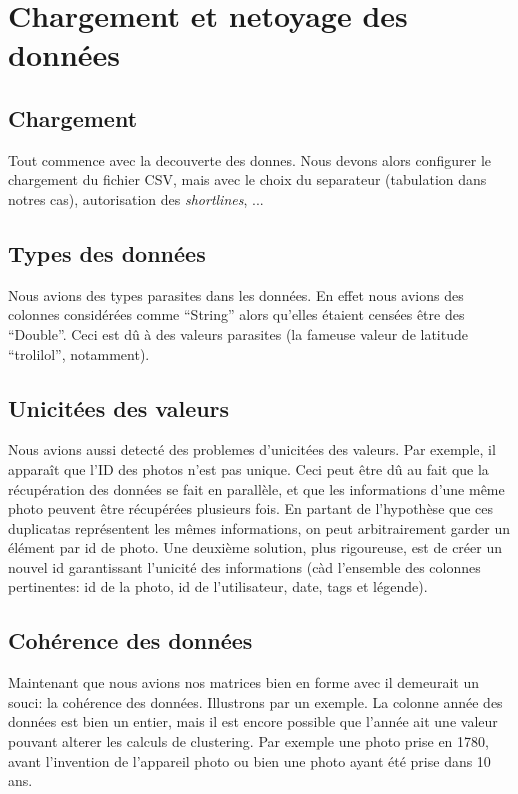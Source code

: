 \chapter{Chargement et netoyage des donn\'ees}

\section{Chargement}
    Tout commence avec la decouverte des donnes. Nous devons alors configurer le
    chargement du fichier CSV, mais avec le choix du separateur (tabulation dans
    notres cas), autorisation des \textit{shortlines}, ...

\section{Types des donn\'ees}
    Nous avions des types parasites dans les donn\'ees. En effet nous
    avions des colonnes considérées comme ``String'' alors qu'elles étaient
    censées être des ``Double''. Ceci est dû à des valeurs parasites (la fameuse
    valeur de latitude ``trolilol'', notamment).

\section{Unicit\'ees des valeurs}
    Nous avions aussi detect\'e des problemes d'unicit\'ees des valeurs. Par
    exemple, il apparaît que l'ID des photos n'est pas unique. Ceci peut être dû
    au fait que la récupération des données se fait en parallèle, et que les
    informations d'une même photo peuvent être récupérées plusieurs fois.
    En partant de l'hypothèse que ces duplicatas représentent les mêmes
    informations, on peut arbitrairement garder un élément par id de photo. Une
    deuxième solution, plus rigoureuse, est de créer un nouvel id garantissant
    l'unicité des informations (càd l'ensemble des colonnes pertinentes: id de
    la photo, id de l'utilisateur, date, tags et légende).

\section{Coh\'erence des donn\'ees}
    Maintenant que nous avions nos matrices bien en forme avec il demeurait un
    souci: la coh\'erence des donn\'ees. Illustrons par un exemple. La colonne
    ann\'ee des donn\'ees est bien un entier, mais il est encore possible que
    l'ann\'ee ait une valeur pouvant alterer les calculs de clustering. Par
    exemple une photo prise en 1780, avant l'invention de l'appareil photo ou
    bien une photo ayant \'et\'e prise dans 10 ans.

